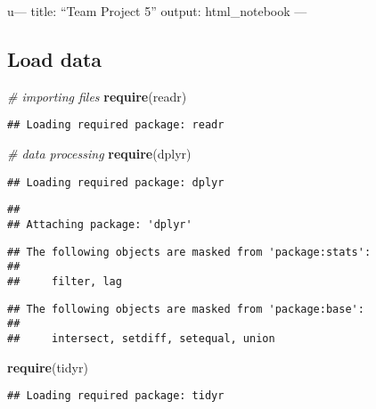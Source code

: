 \documentclass[
]{article}
\author{}
\date{\vspace{-2.5em}}
\newenvironment{Shaded}{\begin{snugshade}}{\end{snugshade}}
\newcommand{\CommentTok}[1]{\textcolor[rgb]{0.56,0.35,0.01}{\textit{#1}}}
\newcommand{\KeywordTok}[1]{\textcolor[rgb]{0.13,0.29,0.53}{\textbf{#1}}}
\newcommand{\NormalTok}[1]{#1}
\begin{document}
u--- title: ``Team Project 5'' output: html\_notebook ---

\hypertarget{load-data}{%
\subsection{Load data}\label{load-data}}

\begin{Shaded}
\begin{Highlighting}[]
\CommentTok{# importing files}
\KeywordTok{require}\NormalTok{(readr)}
\end{Highlighting}
\end{Shaded}

\begin{verbatim}
## Loading required package: readr
\end{verbatim}

\begin{Shaded}
\begin{Highlighting}[]
\CommentTok{# data processing}
\KeywordTok{require}\NormalTok{(dplyr)}
\end{Highlighting}
\end{Shaded}

\begin{verbatim}
## Loading required package: dplyr
\end{verbatim}

\begin{verbatim}
## 
## Attaching package: 'dplyr'
\end{verbatim}

\begin{verbatim}
## The following objects are masked from 'package:stats':
## 
##     filter, lag
\end{verbatim}

\begin{verbatim}
## The following objects are masked from 'package:base':
## 
##     intersect, setdiff, setequal, union
\end{verbatim}

\begin{Shaded}
\begin{Highlighting}[]
\KeywordTok{require}\NormalTok{(tidyr)}
\end{Highlighting}
\end{Shaded}

\begin{verbatim}
## Loading required package: tidyr
\end{verbatim}
\end{document}
